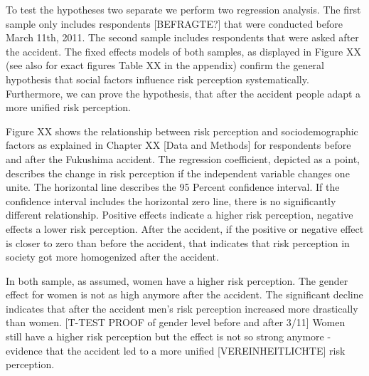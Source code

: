 To test the hypotheses two separate we perform two regression analysis. The first sample only includes respondents [BEFRAGTE?] that were conducted before March 11th, 2011. The second sample includes respondents that were asked after the accident.   
The fixed effects models of both samples, as displayed in Figure XX (see also for exact figures Table XX in the appendix) confirm the general hypothesis that social factors influence risk perception systematically. Furthermore, we can prove the hypothesis, that after the accident people adapt a more unified risk perception.   


Figure XX shows the relationship between risk perception and sociodemographic factors as explained in Chapter XX [Data and Methods] for respondents before and after the Fukushima accident. The regression coefficient, depicted as a point, describes the change in risk perception if the independent variable changes one unite. The horizontal line describes the 95 Percent confidence interval. If the confidence interval includes the horizontal zero line, there is no significantly different relationship. 
Positive effects indicate a higher risk perception, negative effects a lower risk perception. After the accident, if the positive or negative effect is closer to zero than before the accident, that indicates that risk perception in society got more homogenized after the accident.   


In both sample, as assumed, women have a higher risk perception. The gender effect for women is not as high anymore after the accident. The significant decline indicates that after the accident men's risk perception increased more drastically than women. [T-TEST PROOF of gender level before and after 3/11] Women still have a higher risk perception but the effect is not so strong anymore - evidence that the accident led to a more unified [VEREINHEITLICHTE] risk perception.  

